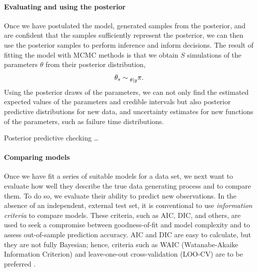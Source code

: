 \paragraph*{Evaluating and using the posterior}

Once we have postulated the model, generated samples from the posterior, and are confident that the samples sufficiently represent the posterior, we can then use the posterior samples to perform inference and inform decisions. The result of fitting the model with MCMC methods is that we obtain $S$ simulations of the parameters $\theta$ from their posterior distribution,
\begin{equation}
  \theta_s \sim \prescript{}{\theta|y}{\pi}.
\end{equation}
Using the posterior draws of the parameters, we can not only find the estimated expected values of the parameters and credible intervals but also posterior predictive distributions for new data, and uncertainty estimates for new functions of the parameters, such as failure time distributions.

Posterior predictive checking \ldots

\paragraph*{Comparing models}

Once we have fit a series of suitable models for a data set, we next want to evaluate how well they describe the true data generating process and to compare them. To do so, we evaluate their ability to predict new observations. In the absence of an independent, external test set, it is conventional to use \textit{information criteria} to compare models. These criteria, such as AIC, DIC, and others, are used to seek a compromise between goodness-of-fit and model complexity and to assess out-of-sample prediction accuracy. AIC and DIC are easy to calculate, but they are not fully Bayesian; hence, criteria such as WAIC (Watanabe-Akaike Information Criterion) and leave-one-out cross-validation (LOO-CV) are to be preferred \citep{Vehtari2017}.

